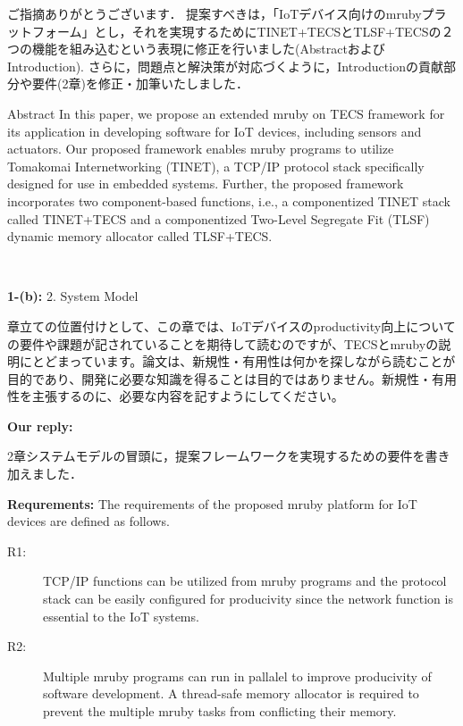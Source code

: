 \documentclass{article}
\begin{document}
\begin{enumerate}
\begin{flushleft}
ご指摘ありがとうございます．
提案すべきは，「IoTデバイス向けのmrubyプラットフォーム」とし，それを実現するためにTINET+TECSとTLSF+TECSの２つの機能を組み込むという表現に修正を行いました(AbstractおよびIntroduction).
さらに，問題点と解決策が対応づくように，Introductionの貢献部分や要件(2章)を修正・加筆いたしました．

\begin{itembox}[|]{Abstract}
In this paper, we propose an extended mruby on TECS framework for its application in developing software for IoT devices, including sensors and actuators. Our proposed framework enables mruby programs to utilize Tomakomai Internetworking (TINET), a TCP/IP protocol stack specifically designed for use in embedded systems. Further, the proposed framework incorporates two component-based functions, i.e., a componentized TINET stack called TINET+TECS and a componentized Two-Level Segregate Fit (TLSF) dynamic memory allocator called TLSF+TECS.
\end{itembox}\\

\end{flushleft}

\begin{flushleft}
\textbf{1-(b):} 2. System Model

章立ての位置付けとして、この章では、IoTデバイスのproductivity向上についての要件や課題が記されていることを期待して読むのですが、TECSとmrubyの説明にとどまっています。論文は、新規性・有用性は何かを探しながら読むことが目的であり、開発に必要な知識を得ることは目的ではありません。新規性・有用性を主張するのに、必要な内容を記すようにしてください。
\end{flushleft}
\begin{flushleft}
\textbf{Our reply:}

2章システムモデルの冒頭に，提案フレームワークを実現するための要件を書き加えました．

\begin{itembox}[|]{}
{\bf Requrements:} The requirements of the proposed mruby platform for IoT devices are defined as follows.
\begin{description}
    \item[R1:]
        TCP/IP functions can be utilized from mruby programs and the protocol stack can be easily configured for producivity since the network function is essential to the IoT systems.

    \item[R2:]
        Multiple mruby programs can run in pallalel to improve producivity of software development.
        A thread-safe memory allocator is required to prevent the multiple mruby tasks from conflicting their memory.


\end{description}
\end{itembox}
\end{flushleft}
\end{enumerate}
\end{document}
